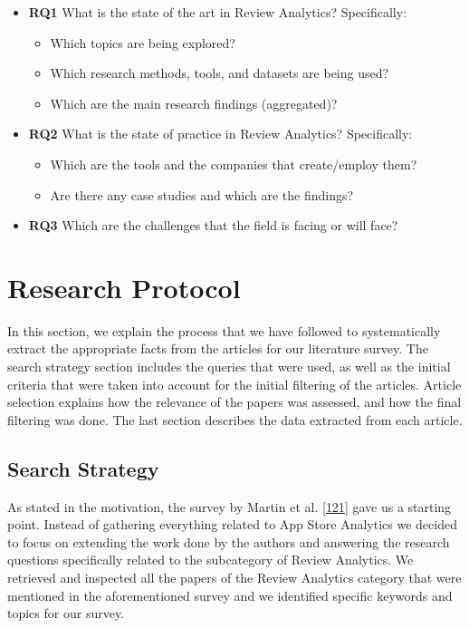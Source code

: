 \documentclass[]{book}
\providecommand{\tightlist}{%
  \setlength{\itemsep}{0pt}\setlength{\parskip}{0pt}}
\begin{document}
\begin{itemize}
\tightlist
\item
  \textbf{RQ1} What is the state of the art in Review Analytics?
  Specifically:

  \begin{itemize}
  \tightlist
  \item
    Which topics are being explored?
  \item
    Which research methods, tools, and datasets are being used?
  \item
    Which are the main research findings (aggregated)?
  \end{itemize}
\item
  \textbf{RQ2} What is the state of practice in Review Analytics?
  Specifically:

  \begin{itemize}
  \tightlist
  \item
    Which are the tools and the companies that create/employ them?
  \item
    Are there any case studies and which are the findings?
  \end{itemize}
\item
  \textbf{RQ3} Which are the challenges that the field is facing or will
  face?
\end{itemize}

\section{Research Protocol}\label{research-protocol-5}

In this section, we explain the process that we have followed to
systematically extract the appropriate facts from the articles for our
literature survey. The search strategy section includes the queries that
were used, as well as the initial criteria that were taken into account
for the initial filtering of the articles. Article selection explains
how the relevance of the papers was assessed, and how the final
filtering was done. The last section describes the data extracted from
each article.

\subsection{Search Strategy}\label{search-strategy-1}

As stated in the motivation, the survey by Martin et al.
{[}\protect\hyperlink{ref-martin2015survey}{121}{]} gave us a starting
point. Instead of gathering everything related to App Store Analytics we
decided to focus on extending the work done by the authors and answering
the research questions specifically related to the subcategory of Review
Analytics. We retrieved and inspected all the papers of the Review
Analytics category that were mentioned in the aforementioned survey and
we identified specific keywords and topics for our survey.
\end{document}
